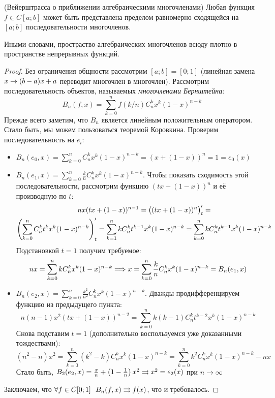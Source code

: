 \begin{theorem} (Вейерштрасса о приближении алгебраическими многочленами)
	Любая функция $f \in C[a; b]$ может быть представлена пределом равномерно сходящейся на $[a; b]$ последовательности многочленов.
\end{theorem}

\begin{note}
	Иными словами, простраство алгебраических многочленов всюду плотно в пространстве непрерывных функций.
\end{note}

\begin{proof}
	Без ограничения общности рассмотрим $[a; b] = [0; 1]$ (линейная замена $x \rightarrow (b - a)x + a$ переводит многочлен в многочлен). Рассмотрим последовательность объектов, называемых \textit{многочленами Бернштейна}:
	\[
		B_n(f, x) = \sum_{k = 0}^n f(k / n) C_n^k x^k(1 - x)^{n - k}
	\]
	Прежде всего заметим, что $B_n$ является линейным положительным оператором. Стало быть, мы можем пользоваться теоремой Коровкина. Проверим последовательность на $e_i$:
	\begin{itemize}
		\item \(B_n(e_0, x) = \sum_{k = 0}^n C_n^k x^k(1 - x)^{n - k} = (x + (1 - x))^n = 1 = e_0(x)\)
		
		\item \(B_n(e_1, x) = \sum_{k = 0}^n \frac{k}{n} C_n^k x^k(1 - x)^{n - k}\). Чтобы показать сходимость этой последовательности, рассмотрим функцию $(tx + (1 - x))^n$ и её производную по $t$:
		\begin{multline*}
			nx(tx + (1 - x))^{n - 1} = \big((tx + (1 - x))^n\big)'_t =
			\\
			\left(\sum_{k = 0}^n C_n^k t^k x^k (1 - x)^{n - k}\right)'_t = \sum_{k = 1}^n kC_n^k t^{k - 1}x^k(1 - x)^{n - k} = \sum_{k = 0}^n kC_n^k t^{k - 1}x^k(1 - x)^{n - k}
		\end{multline*}
		Подстановкой $t = 1$ получим требуемое:
		\[
			nx = \sum_{k = 0}^n kC_n^kx^k(1 - x)^{n - k} \Longrightarrow x = \sum_{k = 0}^n \frac{k}{n} C_n^k x^k(1 - x)^{n - k} = B_n(e_1, x)
		\]
		
		\item \(B_n(e_2, x) = \sum_{k = 0}^n \frac{k^2}{n^2} C_n^k x^k(1 - x)^{n - k}\). Дважды продифференцируем функцию из предыдущего пункта:
		\[
			n(n - 1)x^2(tx + (1 - x))^{n - 2} = \sum_{k = 0}^n k(k - 1)C_n^k t^{k - 2} x^k(1 - x)^{n - k}
		\]
		Снова подставим $t = 1$ (дополнительно воспользуемся уже доказанными тождествами):
		\[
			(n^2 - n)x^2 = \sum_{k = 0}^n (k^2 - k)C_n^k x^k(1 - x)^{n - k} = \sum_{k = 0}^n k^2C_n^k x^k(1 - x)^{n - k} - nx
		\]
		Стало быть, $B_2(e_2, x) = \frac{x}{n} + \left(1 - \frac{1}{n}\right)x^2 \rightrightarrows x^2 = e_2(x)$ при $n \to \infty$
	\end{itemize}
	Заключаем, что $\forall f \in C[0; 1]\ \ B_n(f, x) \rra f(x)$, что и требовалось.
\end{proof}

